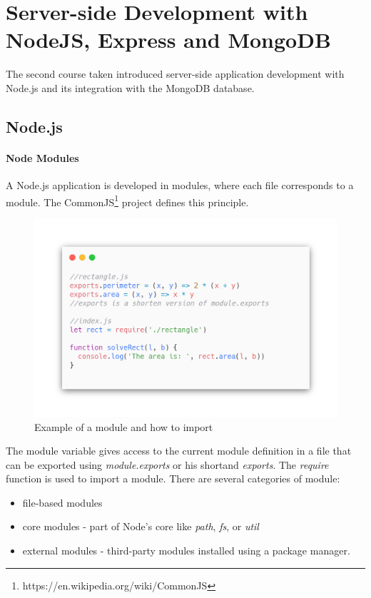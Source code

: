 \chapter*{Server-side Development with NodeJS, Express and MongoDB}

The second course taken introduced server-side application development with Node.js and its integration with the MongoDB database.

\section*{Node.js}

\subsubsection*{Node Modules}
A Node.js application is developed in modules, where each file corresponds to a module. The CommonJS\footnote{https://en.wikipedia.org/wiki/CommonJS} project defines this principle.


\begin{figure}[!ht]
    \includegraphics[width=\textwidth]{assets/modulenode.png}
    \caption{Example of a module and how to import}
    \label{fig:node-module}
\end{figure}

The module variable gives access to the current module definition in a file that can be exported using \textit{module.exports} or his shortand \textit{exports}.
The \textit{require} function is used to import a module.
There are several categories of module:
\begin{itemize}
    \item file-based modules
    \item core modules - part of Node's core like \textit{path}, \textit{fs}, or \textit{util}
    \item external modules - third-party modules installed using a package manager.
\end{itemize}


